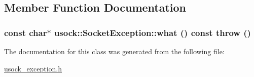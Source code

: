 \subsection{Member Function Documentation}
\hypertarget{classusock_1_1SocketException_8ad4730be89374b7ee56d56b2617f7a1}{
\subsubsection[{what}]{\setlength{\rightskip}{0pt plus 5cm}const char$\ast$ usock::SocketException::what () const  throw ()}}
\label{classusock_1_1SocketException_8ad4730be89374b7ee56d56b2617f7a1}




The documentation for this class was generated from the following file:\begin{CompactItemize}
\item 
\hyperlink{usock__exception_8h}{usock\_\-exception.h}\end{CompactItemize}

